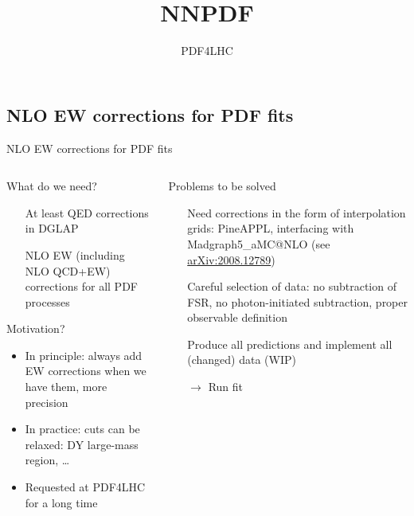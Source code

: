 \title{NNPDF}
\author[Christopher Schwan]{}
\date{PDF4LHC}

\subsection{NLO EW corrections for PDF fits}

\begin{frame}{NLO EW corrections for PDF fits}
\begin{columns}[onlytextwidth]
\begin{column}{0.45\textwidth}

\begin{block}{What do we need?}
\begin{itemize}
\item[\ding{51}] At least QED corrections in DGLAP
\item[\ding{55}] NLO EW (including NLO QCD+EW) corrections for all PDF processes
\end{itemize}
\end{block}

\vspace*{0.7cm}

\begin{block}{Motivation?}
\begin{itemize}
\item In principle: always add EW corrections when we have them, more precision
\item In practice: cuts can be relaxed: DY large-mass region, \ldots
\item Requested at PDF4LHC for a long time
\end{itemize}
\end{block}
\end{column}
\begin{column}{0.45\textwidth}
\begin{block}{Problems to be solved}
\begin{itemize}
\item[\ding{51}] Need corrections in the form of \alert{interpolation grids}: PineAPPL, interfacing with Madgraph5\_aMC@NLO (see \href{https://arxiv.org/abs/2008.12789}{arXiv:2008.12789})
\item[\ding{51}] Careful selection of data: no subtraction of FSR, no photon-initiated subtraction, proper observable definition
\item[\ding{55}] Produce all predictions and implement all (changed) data (WIP)
\item[$\rightarrow$] Run fit
\end{itemize}
\end{block}
\end{column}
\end{columns}
\end{frame}

